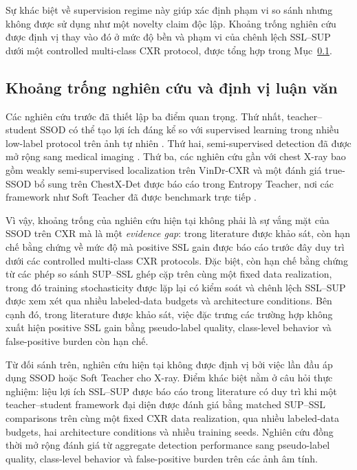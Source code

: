 \documentclass[pdflatex,sn-mathphys-num]{sn-jnl}%
\theoremstyle{thmstyleone}%
\theoremstyle{thmstyletwo}%
\theoremstyle{thmstylethree}%
\begin{document}
Sự khác biệt về supervision regime này giúp xác định phạm vi so sánh nhưng không
được sử dụng như một novelty claim độc lập. Khoảng trống nghiên cứu được định vị
thay vào đó ở mức độ bền và phạm vi của chênh lệch SSL--SUP dưới một controlled
multi-class CXR protocol, được tổng hợp trong Mục~\ref{sec:research_gap}.
 
\subsection{Khoảng trống nghiên cứu và định vị luận văn}
\label{sec:research_gap}

Các nghiên cứu trước đã thiết lập ba điểm quan trọng. Thứ nhất, teacher--student
SSOD có thể tạo lợi ích đáng kể so với supervised learning trong nhiều low-label
protocol trên ảnh tự nhiên \cite{sohn2020simple,liu2021unbiased,xu2021end}.
Thứ hai, semi-supervised detection đã được mở rộng sang medical imaging
\cite{wang2020focalmix,wen2024robust}. Thứ ba, các nghiên cứu gần với chest
X-ray bao gồm weakly semi-supervised localization trên VinDr-CXR
\cite{ji2022benchmark} và một đánh giá true-SSOD bổ sung trên ChestX-Det được
báo cáo trong Entropy Teacher, nơi các framework như Soft Teacher đã được
benchmark trực tiếp \cite{zhu2025entropy}.

Vì vậy, khoảng trống của nghiên cứu hiện tại không phải là sự vắng mặt của SSOD
trên CXR mà là một \textit{evidence gap}: trong literature được khảo sát, còn
hạn chế bằng chứng về mức độ mà positive SSL gain được báo cáo trước đây duy trì
dưới các controlled multi-class CXR protocols. Đặc biệt, còn hạn chế bằng chứng từ các phép
so sánh SUP--SSL ghép cặp trên cùng một fixed data realization, trong đó
training stochasticity được lặp lại có kiểm soát và chênh lệch SSL--SUP được xem xét qua nhiều labeled-data budgets và architecture conditions. Bên cạnh đó, trong literature được khảo sát, việc đặc trưng các trường hợp không xuất hiện positive SSL gain bằng pseudo-label quality, class-level behavior và false-positive burden còn hạn chế.

Từ đối sánh trên, nghiên cứu hiện tại không được định vị bởi việc lần đầu áp dụng
SSOD hoặc Soft Teacher cho X-ray. Điểm khác biệt nằm ở câu hỏi thực nghiệm:
liệu lợi ích SSL--SUP được báo cáo trong literature có duy trì khi một
teacher--student framework đại diện được đánh giá bằng matched SUP--SSL
comparisons trên cùng một fixed CXR data realization, qua nhiều labeled-data budgets,
hai architecture conditions và nhiều training seeds. Nghiên cứu đồng thời mở
rộng đánh giá từ aggregate detection performance sang pseudo-label quality,
class-level behavior và false-positive burden trên các ảnh âm tính.
\end{document}
